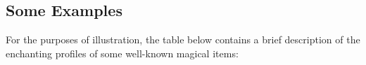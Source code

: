 



\subsection{Some Examples}\label{E:EnchantingExamples}

For the purposes of illustration, the table below contains a brief description of the enchanting profiles of some well-known magical items:

\newcommand\artefactRow[6]{\small \imp{#1} & \parbox[t]{1 cm}{\raggedright \rune{#2}\\ {\it \tiny #3\\#4\\#5}}& \parbox[t]{5.4 cm}{\raggedright \footnotesize #6}  \\} 
\newcommand\artefactList[2]
{
	\small
	\subsubsection{#1}
	\begin{center}
	\begin{rndtable}{p{2cm} c c c}
		Name	&	Runes	&	Description	 \\
		#2
	\end{rndtable}
\end{center}
	
	\normalsize
}


